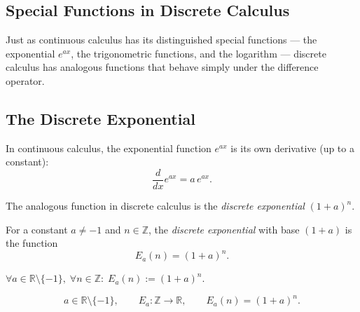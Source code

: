 
\subsection{Special Functions in Discrete Calculus}
\label{sec:special-functions}

\begin{exposition}
Just as continuous calculus has its distinguished special functions ---
the exponential \(e^{ax}\), the trigonometric functions, and the logarithm
--- discrete calculus has analogous functions that behave simply under the
difference operator.
\end{exposition}

\subsection*{The Discrete Exponential}

\begin{exposition}
In continuous calculus, the exponential function \(e^{ax}\) is its own
derivative (up to a constant):
\[
\frac{d}{dx} e^{ax} = a\, e^{ax}.
\]

The analogous function in discrete calculus is the \emph{discrete
exponential} \((1+a)^n\).
\end{exposition}

\begin{definition}
\label{def:discrete-exponential}
For a constant \(a \ne -1\) and \(n \in \mathbb{Z}\), the
\emph{discrete exponential} with base \((1+a)\) is the function
\[
E_a(n) = (1+a)^n.
\]
\end{definition}

\DefinitionalRoot

\begin{remark*}
\(\forall a \in \mathbb{R}\setminus\{-1\},\; \forall n \in \mathbb{Z}:\;
E_a(n) := (1+a)^n\).
\end{remark*}

\begin{remark*}
\[
  a\in\mathbb{R}\setminus\{-1\},\qquad
  E_a\colon\mathbb{Z}\to\mathbb{R},\qquad
  E_a(n)=(1+a)^n.
\]
\end{remark*}

